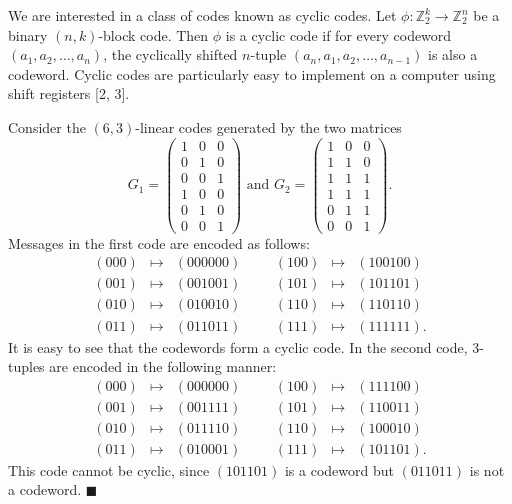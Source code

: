 We are interested in a class of codes known as cyclic codes.  Let $\phi : {\mathbb Z}_2^k \rightarrow {\mathbb  Z}_2^n$ be a binary $(n,k)$-block code.  Then $\phi$ is a {\bfi cyclic code\/} if for every codeword $(a_1, a_2, \ldots, a_n )$, the cyclically shifted $n$-tuple $(a_n, a_1, a_2, \ldots, a_{n-1} )$ is also a codeword.  Cyclic codes are particularly easy to implement on a  computer using shift registers [2, 3].  

\medskip

Consider the $(6,3)$-linear codes generated by the two matrices
$$
G_1 
= 
\left(
\begin{array}{ccc}
1 & 0 & 0 \\
0 & 1 & 0 \\
0 & 0 & 1 \\
1 & 0 & 0 \\
0 & 1 & 0 \\
0 & 0 & 1 
\end{array}
\right)
\mbox{ and }
G_2 = 
\left(
\begin{array}{ccc}
1 & 0 & 0 \\
1 & 1 & 0 \\
1 & 1 & 1 \\
1 & 1 & 1 \\
0 & 1 & 1 \\
0 & 0 & 1
\end{array}
\right).
$$
Messages in the first code are encoded as follows:
$$
\begin{array}{rclccrcl}
(000) & \mapsto & (000000) & & & (100) & \mapsto & (100100) \\
(001) & \mapsto & (001001) & & & (101) & \mapsto & (101101) \\
(010) & \mapsto & (010010) & & & (110) & \mapsto & (110110) \\
(011) & \mapsto & (011011) & & & (111) & \mapsto & (111111).
\end{array}
$$
It is easy to see that the codewords form a cyclic code.  In the second code, 3-tuples are encoded in the following manner:
$$
\begin{array}{rclccrcl}
(000) & \mapsto & (000000) & & & (100) & \mapsto & (111100) \\
(001) & \mapsto & (001111) & & & (101) & \mapsto & (110011) \\
(010) & \mapsto & (011110) & & & (110) & \mapsto & (100010) \\
(011) & \mapsto & (010001) & & & (111) & \mapsto & (101101).
\end{array}
$$
This code cannot be cyclic, since $(101101)$ is a codeword but $(011011)$ is not a codeword.
\hspace{\fill} $\blacksquare$


